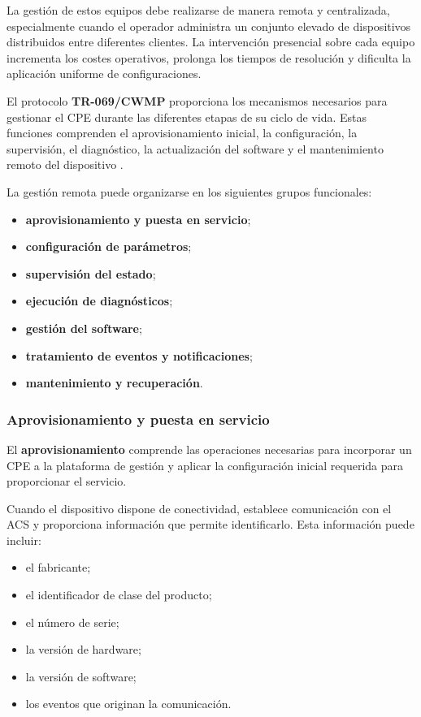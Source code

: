 La gestión de estos equipos debe realizarse de manera remota y
centralizada, especialmente cuando el operador administra un conjunto
elevado de dispositivos distribuidos entre diferentes clientes. La
intervención presencial sobre cada equipo incrementa los costes
operativos, prolonga los tiempos de resolución y dificulta la aplicación
uniforme de configuraciones.

El protocolo \textbf{TR-069/CWMP} proporciona los mecanismos necesarios
para gestionar el CPE durante las diferentes etapas de su ciclo de vida.
Estas funciones comprenden el aprovisionamiento inicial, la configuración,
la supervisión, el diagnóstico, la actualización del software y el
mantenimiento remoto del dispositivo \cite{bbf_tr069}.

La gestión remota puede organizarse en los siguientes grupos
funcionales:

\begin{itemize}
    \item \textbf{aprovisionamiento y puesta en servicio};
    \item \textbf{configuración de parámetros};
    \item \textbf{supervisión del estado};
    \item \textbf{ejecución de diagnósticos};
    \item \textbf{gestión del software};
    \item \textbf{tratamiento de eventos y notificaciones};
    \item \textbf{mantenimiento y recuperación}.
\end{itemize}


\subsubsection*{Aprovisionamiento y puesta en servicio}

El \textbf{aprovisionamiento} comprende las operaciones necesarias para
incorporar un CPE a la plataforma de gestión y aplicar la configuración
inicial requerida para proporcionar el servicio.

Cuando el dispositivo dispone de conectividad, establece comunicación
con el ACS y proporciona información que permite identificarlo. Esta
información puede incluir:

\begin{itemize}
    \item el fabricante;
    \item el identificador de clase del producto;
    \item el número de serie;
    \item la versión de hardware;
    \item la versión de software;
    \item los eventos que originan la comunicación.
\end{itemize}


